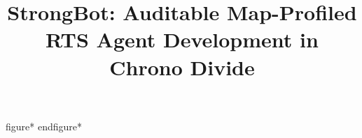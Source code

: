\documentclass[a4paper,twoside]{article}
\title{StrongBot: Auditable Map-Profiled RTS Agent Development in Chrono Divide}
\author{\authorname{Anonymous Author(s)}}
\begin{document}
\onecolumn
\maketitle
\normalsize
\setcounter{footnote}{0}
\vfill



\begingroup
\expandafter\let\expandafter\scitepressfigure\csname figure*\endcsname
\expandafter\let\expandafter\endscitepressfigure\csname endfigure*\endcsname
\renewenvironment{figure}[1][t]{\scitepressfigure[#1]}{\endscitepressfigure}

\endgroup








\end{document}
